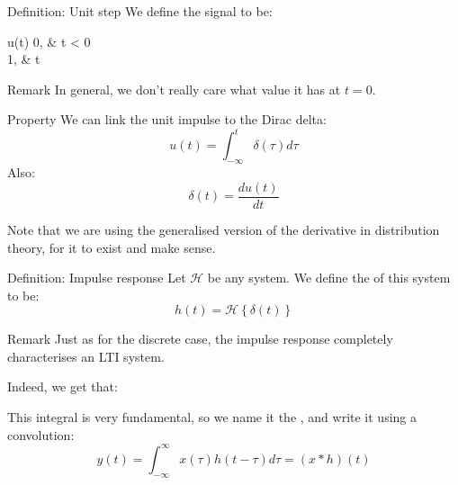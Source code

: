 \documentclass[a4paper]{article}
\begin{document}
\begin{parag}{Definition: Unit step}
    We define the  signal to be:
    \begin{functionbypart}{u\left(t\right)}
        0, & t < 0 \\
        1, & t 
    \end{functionbypart} 

    \begin{subparag}{Remark}
        In general, we don't really care what value it has at $t = 0$.
    \end{subparag}

    \begin{subparag}{Property}
        We can link the unit impulse to the Dirac delta: 
        \[u\left(t\right) = \int_{-\infty}^{t} \delta\left(\tau\right) d\tau\]
        Also: 
        \[\delta\left(t\right) = \frac{du\left(t\right)}{dt}\]
        
        Note that we are using the generalised version of the derivative in distribution theory, for it to exist and make sense.
    \end{subparag}
\end{parag}

\begin{parag}{Definition: Impulse response}
    Let $\mathcal{H}$ be any system. We define the  of this system to be: 
    \[h\left(t\right) = \mathcal{H}\left\{\delta\left(t\right)\right\}\]
    
    \begin{subparag}{Remark}
        Just as for the discrete case, the impulse response completely characterises an LTI system. 

        Indeed, we get that: 

        This integral is very fundamental, so we name it the , and write it using a convolution: 
        \[y\left(t\right) = \int_{-\infty}^{\infty} x\left(\tau\right) h\left(t-\tau\right)d\tau = \left(x * h\right)\left(t\right)\]
    \end{subparag}
\end{parag}
\end{document}

